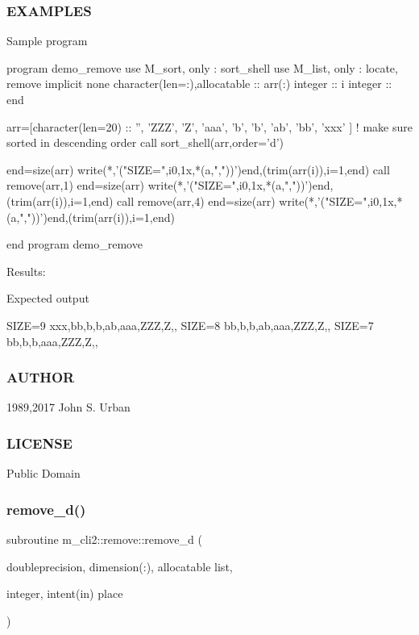 \subsubsection*{E\+X\+A\+M\+P\+L\+ES}

Sample program \begin{DoxyVerb}program demo_remove
use M_sort, only : sort_shell
use M_list, only : locate, remove
implicit none
character(len=:),allocatable :: arr(:)
integer                       :: i
integer                       :: end

arr=[character(len=20) :: '', 'ZZZ', 'Z', 'aaa', 'b', 'b', 'ab', 'bb', 'xxx' ]
! make sure sorted in descending order
call sort_shell(arr,order='d')

end=size(arr)
write(*,'("SIZE=",i0,1x,*(a,","))')end,(trim(arr(i)),i=1,end)
call remove(arr,1)
end=size(arr)
write(*,'("SIZE=",i0,1x,*(a,","))')end,(trim(arr(i)),i=1,end)
call remove(arr,4)
end=size(arr)
write(*,'("SIZE=",i0,1x,*(a,","))')end,(trim(arr(i)),i=1,end)

end program demo_remove
\end{DoxyVerb}


Results\+:

Expected output

S\+I\+ZE=9 xxx,bb,b,b,ab,aaa,Z\+ZZ,Z,, S\+I\+ZE=8 bb,b,b,ab,aaa,Z\+ZZ,Z,, S\+I\+ZE=7 bb,b,b,aaa,Z\+ZZ,Z,,

\subsubsection*{A\+U\+T\+H\+OR}

1989,2017 John S. Urban \subsubsection*{L\+I\+C\+E\+N\+SE}

Public Domain \mbox{\label{interfacem__cli2_1_1remove_a0d123599053c144f5ab233b735a38f1d}} 
\subsubsection{\texorpdfstring{remove\+\_\+d()}{remove\_d()}}
{\footnotesize\ttfamily subroutine m\+\_\+cli2\+::remove\+::remove\+\_\+d (\begin{DoxyParamCaption}\item[{doubleprecision, dimension(\+:), allocatable}]{list,  }\item[{integer, intent(in)}]{place }\end{DoxyParamCaption})\hspace{0.3cm}{\ttfamily [private]}}

